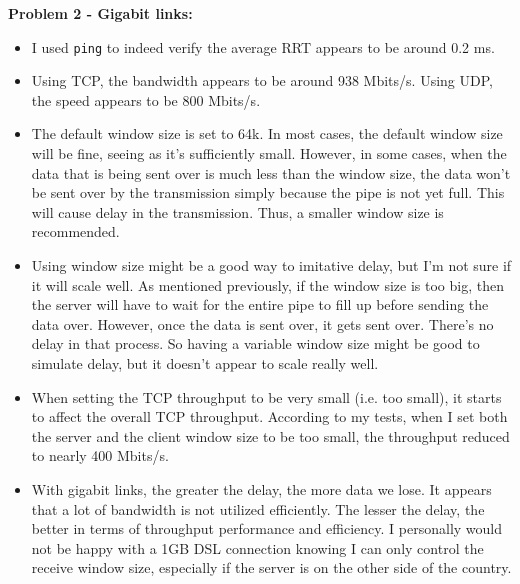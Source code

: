 \documentclass[10pt]{article}
\newcommand{\Problem}[1]{\noindent \textbf{\textbf{Problem #1:  \\ }}}
\begin{document}
\Problem{2 - Gigabit links}
\begin{itemize}
\itemsep0em
\item I used \texttt{ping} to indeed verify the average RRT appears to be around 0.2 ms.
\item Using TCP, the bandwidth appears to be around 938 Mbits/s.  Using UDP, the speed appears to be 800 Mbits/s. 
\item The default window size is set to 64k.  In most cases, the default window size will be fine, seeing as it's sufficiently small.  However, in some cases, when the data that is being sent over is much less than the window size, the data won't be sent over by the transmission simply because the pipe is not yet full.  This will cause delay in the transmission.  Thus, a smaller window size is recommended.
\item Using window size might be a good way to imitative delay, but I'm not sure if it will scale well.  As mentioned previously, if the window size is too big, then the server will have to wait for the entire pipe to fill up before sending the data over.  However, once the data is sent over, it gets sent over.  There's no delay in that process.  So having a variable window size might be good to simulate delay, but it doesn't appear to scale really well.
\item When setting the TCP throughput to be very small (i.e. too small), it starts to affect the overall TCP throughput.  According to my tests, when I set both the server and the client window size to be too small, the throughput reduced to nearly 400 Mbits/s.
\item With gigabit links,  the greater the delay, the more data we lose.  It appears that a lot of bandwidth is not utilized efficiently.  The lesser the delay, the better in terms of throughput performance and efficiency.  I personally would not be happy with a 1GB DSL connection knowing I can only control the receive window size, especially if the server is on the other side of the country.
\end{itemize}
\end{document}
